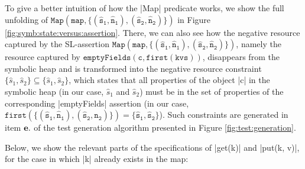 To give a better intuition of how the \jsinline|Map| predicate works, we show the full unfolding of {\small$\mathtt{Map(map, \{ (\hat{s}_1, \hat{n}_1), (\hat{s}_2, \hat{n}_2) \} )}$} in Figure \ref{fig:symb:state:versus:assertion}.
%
%
There, we can also see how the negative resource captured by the SL-assertion {\small$\mathtt{Map(map, \{ (\hat{s}_1, \hat{n}_1), (\hat{s}_2, \hat{n}_2) \} )}$}, namely the resource captured by {\small$\mathtt{emptyFields(c, first(kvs))}$}, disappears from the symbolic heap and is transformed into the negative resource constraint $\{ \hat{s}_1, \hat{s}_2 \} \subseteq \{ \hat{s}_1, \hat{s}_2 \}$, which states that all properties of the object \jsinline|c| in the symbolic heap (in our case, $\hat{s}_1$ and $\hat{s}_2$) must be in the set of properties of the corresponding \jsinline|emptyFields| assertion (in our case, {\small$\mathtt{first(\{ (\hat{s}_1, \hat{n}_1), (\hat{s}_2, \hat{n}_2) \}) = \{ \hat{s}_1, \hat{s}_2 \}}$}).
Such constraints are generated in item ${\bf e.}$ of the test generation algorithm presented in Figure \ref{fig:test:generation}. 

Below, we show the relevant parts of the specifications of \jsinline|get(k)| and \jsinline|put(k, v)|, for the case in which
 \jsinline|k| already exists in the map:

